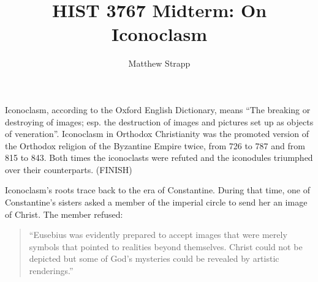 \documentclass{article}
\title{HIST 3767 Midterm: On Iconoclasm}
\author{Matthew Strapp}
\begin{document}
\begin{singlespace}
    \maketitle
\end{singlespace}
    Iconoclasm, according to the Oxford English Dictionary, means ``The breaking or destroying of images; esp. the destruction of images and pictures set up as objects of veneration''\cite{oed:iconoclasm}. Iconoclasm in Orthodox Christianity was the promoted version of the Orthodox religion of the Byzantine Empire twice, from 726 to 787 and from 815 to 843. Both times the iconoclasts were refuted and the iconodules triumphed over their counterparts. (FINISH)


    Iconoclasm's roots trace back to the era of Constantine. During that time, one of Constantine's sisters asked a member of the imperial circle to send her an image of Christ. The member refused:
    \begin{quote}
        ``Eusebius was evidently prepared to accept images that were merely symbols that pointed to realities beyond themselves. Christ could not be depicted but some of God's mysteries could be revealed by artistic renderings.''
        \cite{CarlIcons}
    
    \end{quote} 
    
    
\end{document}
